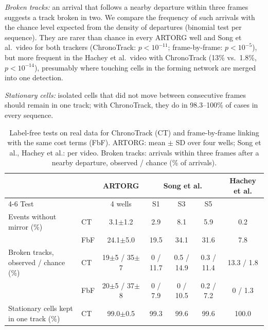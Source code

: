 \documentclass[onecolumn,10pt]{IEEEtran}
\begin{document}
\emph{Broken tracks:} an arrival that follows a nearby departure within three frames suggests a track broken in two. We compare the frequency of such arrivals with the chance level expected from the density of departures (binomial test per sequence). They are rarer than chance in every ARTORG well and Song et al.\ video for both trackers (ChronoTrack: $p<10^{-11}$; frame-by-frame: $p<10^{-5}$), but more frequent in the Hachey et al.\ video with ChronoTrack (13\% vs.\ 1.8\%, $p<10^{-14}$), presumably where touching cells in the forming network are merged into one detection.

\emph{Stationary cells:} isolated cells that did not move between consecutive frames should remain in one track; with ChronoTrack, they do in 98.3--100\% of cases in every sequence.

\begin{table}[h]
\centering
\caption{Label-free tests on real data for ChronoTrack (CT) and frame-by-frame linking with the same cost terms (FbF). ARTORG: mean $\pm$ SD over four wells; Song et al., Hachey et al.: per video. Broken tracks: arrivals within three frames after a nearby departure, observed / chance (\% of arrivals).}
\label{tab:labelfree}
\begin{tabular}{llccccc}
\toprule
 & & ARTORG & \multicolumn{3}{c}{Song et al.} & Hachey et al. \\
\cmidrule(lr){4-6}
Test & & 4 wells & S1 & S3 & S5 & \\
\midrule
Events without mirror (\%) & CT & 3.1$\pm$1.2 & 2.9 & 8.1 & 5.9 & 0.2 \\
 & FbF & 24.1$\pm$5.0 & 19.5 & 34.1 & 31.6 & 7.8 \\
Broken tracks, observed / chance (\%) & CT & 19$\pm$5 / 35$\pm$7 & 0 / 11.7 & 0.5 / 14.9 & 0.3 / 11.4 & 13.3 / 1.8 \\
 & FbF & 20$\pm$5 / 37$\pm$8 & 0 / 7.9 & 0 / 10.5 & 0.2 / 7.2 & 0 / 1.3 \\
Stationary cells kept in one track (\%) & CT & 99.0$\pm$0.5 & 99.3 & 99.6 & 99.6 & 100.0 \\
\bottomrule
\end{tabular}
\end{table}
\end{document}
